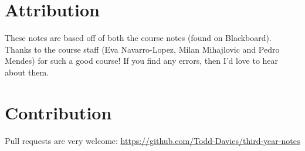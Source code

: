 \section*{Attribution}

These notes are based off of both the course notes (found on
Blackboard). Thanks to the course staff (Eva Navarro-Lopez, Milan
Mihajlovic and Pedro Mendes) for such a good course! If you find any
errors, then I'd love to hear about them.

\section*{Contribution}

Pull requests are very welcome:
\url{https://github.com/Todd-Davies/third-year-notes}
